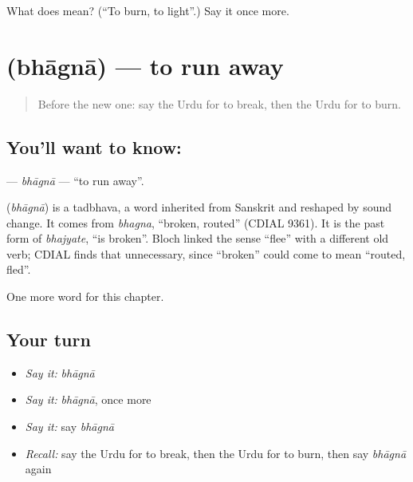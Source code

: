 \begin{tcolorbox}[breakable,colback=teal!4,colframe=teal!35!black,title={Before you move on}]
What does  mean? (\textquotedblleft{}To burn, to light\textquotedblright{}.) Say it once more.
\end{tcolorbox}
\section[\texorpdfstring{\ur{بھاگنا} (bhāgnā)}{بھاگنا (bhāgnā)}]{ (bhāgnā) — to run away}

\label{lesson:UR-C139-bhagna}



\begin{quote}
Before the new one: say the Urdu for to break, then the Urdu for to burn.
\end{quote}

\subsection*{You'll want to know: }
\textbf{} — \emph{bhāgnā} — \textquotedblleft{}to run away\textquotedblright{}.

\begin{cousinweb}
\textbf{} (\emph{bhāgnā}) is a tadbhava, a word inherited from Sanskrit and reshaped by sound change. It comes from \emph{bhagna}, \textquotedblleft{}broken, routed\textquotedblright{} (CDIAL 9361). It is the past form of \emph{bhajyate}, \textquotedblleft{}is broken\textquotedblright{}. Bloch linked the sense \textquotedblleft{}flee\textquotedblright{} with a different old verb; CDIAL finds that unnecessary, since \textquotedblleft{}broken\textquotedblright{} could come to mean \textquotedblleft{}routed, fled\textquotedblright{}.
\end{cousinweb}

\begin{grammarlens}[title={What you've built}]
One more word for this chapter.
\end{grammarlens}

\subsection*{Your turn}
\begin{itemize}
\raggedright
  \item \emph{Say it:} \emph{bhāgnā}
  \item \emph{Say it:} \emph{bhāgnā}, once more
  \item \emph{Say it:} say \emph{bhāgnā}
  \item \emph{Recall:} say the Urdu for to break, then the Urdu for to burn, then say \emph{bhāgnā} again
\end{itemize}

